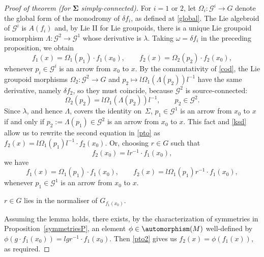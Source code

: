 \begin{proof}[Proof of theorem (for $\boldsymbol{\Sigma}$ simply-connected)]
For $i=1$ or $2$, let $\Omega_i \colon {\mathcal G}^i \rightarrow G$
denote the global form of the monodromy of $\delta f_i$, as defined at
\eqref{global}. The Lie algebroid of ${\mathcal G}^i$ is $A(f_i)$ and,
by Lie II for Lie groupoids, there is a unique Lie groupoid
isomorphism $\Lambda \colon {\mathcal G}^2\rightarrow {\mathcal G}^1$
whose derivative is $\lambda$. Taking $\omega = \delta f_i$ in the
preceding proposition, we obtain
\begin{equation} f_1(x) = \Omega_1(p_1) \cdot f_1(x_0),\qquad f_2(x) =
\Omega_2(p_2) \cdot f_2(x_0), \label{pto}
\end{equation} whenever $p_i \in {\mathcal G}^i$ is an arrow from
$x_0$ to $x$. By the commutativity of \eqref{cod}, the Lie groupoid
morphisms $\Omega_2 \colon {\mathcal G}^2 \rightarrow G$ and $p_2
\mapsto l \Omega_1({\Lambda}(p_2))l^{-1}$ have the same
derivative, namely $\delta f_2$, so they must coincide, because
${\mathcal G}^2$ is source-connected:
\begin{equation}
\Omega_2(p_2) = l\Omega_1({\Lambda}(p_2))l^{-1},\qquad
p_2 \in {\mathcal G}^2.\label{ksd}
\end{equation}
Since $\lambda$, and hence $\Lambda$, covers the
identity on~$\Sigma $, $p_1 \in {\mathcal G}^1$ is an arrow from $x_0$
to $x$ if and only if $p_2:=\Lambda(p_1)\in {\mathcal G}^2$ is an
arrow from $x_0$ to $x$. This fact and \eqref{ksd} allow us to rewrite
the second equation in \eqref{pto} as $f_2(x)=l \Omega_1(p_1)l^{-1}
\cdot f_2(x_0)$. Or, choosing $r \in G$ such that
\begin{equation} f_2(x_0)=lr^{-1}\cdot f_1(x_0),\label{five}
\end{equation} we have
\begin{equation} f_1(x) = \Omega_1(p_1) \cdot f_1(x_0),\qquad f_2(x) =
l\Omega_1(p_1)r^{-1} \cdot f_1(x_0), \label{pto2}
\end{equation} whenever $p_1 \in {\mathcal G}^1$ is an arrow from
$x_0$ to $x$.
\begin{Lemma} $r \in G$ lies in the normaliser of $G_{f_1(x_0)}$.
\end{Lemma}

Assuming the lemma holds, there exists, by the
characterization of symmetries in Proposition~\ref{symmetriesP}, an
element $\phi \in \automorphism(M)$ well-defined by $\phi(g \cdot
f_1(x_0))=lgr^{-1}\cdot f_1(x_0)$. Then \eqref{pto2} gives us
$f_2(x)=\phi(f_1(x))$, as required.
\end{proof}
%
